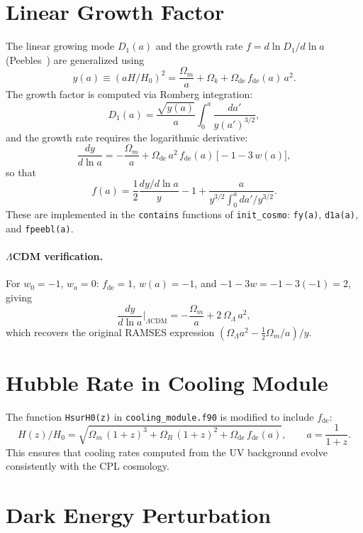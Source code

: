 \documentclass[11pt,fleqn]{book}
\begin{document}
\section{Linear Growth Factor}

The linear growing mode $D_1(a)$ and the growth rate $f = d\ln D_1/d\ln a$ (Peebles~\cite{Peebles1980}) are generalized using
\begin{equation}\label{eq:y_cpl}
  y(a) \equiv (aH/H_0)^2 = \frac{\Omega_m}{a} + \Omega_k + \Omega_{\mathrm{de}}\,f_{\mathrm{de}}(a)\,a^2.
\end{equation}
The growth factor is computed via Romberg integration:
\[
  D_1(a) = \frac{\sqrt{y(a)}}{a}\int_0^a \frac{da'}{y(a')^{3/2}},
\]
and the growth rate requires the logarithmic derivative:
\begin{equation}\label{eq:dyda}
  \frac{dy}{d\ln a} = -\frac{\Omega_m}{a}
    + \Omega_{\mathrm{de}}\,a^2\,f_{\mathrm{de}}(a)\,\bigl[-1 - 3\,w(a)\bigr],
\end{equation}
so that
\[
  f(a) = \frac{1}{2}\frac{dy/d\!\ln a}{y} - 1
    + \frac{a}{y^{3/2}\!\int_0^a da'/y^{3/2}}.
\]
These are implemented in the \texttt{contains} functions of \texttt{init\_cosmo}: \texttt{fy(a)}, \texttt{d1a(a)}, and \texttt{fpeebl(a)}.

\paragraph{$\Lambda$CDM verification.}
For $w_0=-1$, $w_a=0$: $f_{\mathrm{de}}=1$, $w(a)=-1$, and $-1-3w=-1-3(-1)=2$, giving
\[
  \frac{dy}{d\ln a}\Big|_{\Lambda\mathrm{CDM}} = -\frac{\Omega_m}{a} + 2\,\Omega_\Lambda\,a^2,
\]
which recovers the original RAMSES expression $(\Omega_\Lambda a^2 - \tfrac{1}{2}\Omega_m/a)/y$.

\section{Hubble Rate in Cooling Module}

The function \texttt{HsurH0(z)} in \texttt{cooling\_module.f90} is modified to include $f_{\mathrm{de}}$:
\begin{equation}
  H(z)/H_0 = \sqrt{\Omega_m\,(1+z)^3 + \Omega_R\,(1+z)^2 + \Omega_{\mathrm{de}}\,f_{\mathrm{de}}(a)},
  \qquad a = \frac{1}{1+z}.
\end{equation}
This ensures that cooling rates computed from the UV background evolve consistently with the CPL cosmology.

\section{Dark Energy Perturbation}
\label{sec:de_perturb}
\end{document}
